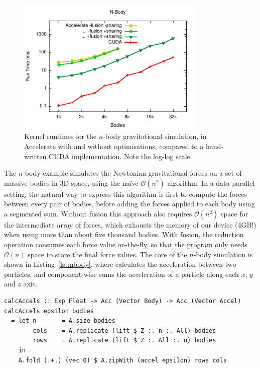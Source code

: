 \begin{figure}
    \begin{center}
        \includegraphics[width=0.8\textwidth]{images/sec-6/nbody/nbody}
    \end{center}
    \caption[N-body gravitational simulation kernel benchmarks]{Kernel runtimes
        for the $n$-body gravitational simulation, in Accelerate with and
        without optimisations, compared to a hand-written CUDA implementation.
        Note the log-log scale.}
    \label{fig:nbody}
\end{figure}

The $n$-body example simulates the Newtonian gravitational forces on a set of
massive bodies in 3D space, using the na\"ive $\mathcal{O}\left( n^{2} \right)$
algorithm. In a data-parallel setting, the natural way to express this algorithm
is first to compute the forces between every pair of bodies, before adding the
forces applied to each body using a segmented sum. Without fusion this approach
also requires $\mathcal{O}\left( n^{2} \right)$ space for the intermediate array
of forces, which exhausts the memory of our device (4GB!) when using more than
about five thousand bodies. With fusion, the reduction operation consumes each
force value on-the-fly, so that the program only needs $\mathcal{O}\left( n
\right)$ space to store the final force values. The core of the $n$-body
simulation is shown in Listing~\ref{lst:nbody}, where  calculates
the acceleration between two particles, and  component-wise sums the
acceleration of a particle along each $x$, $y$ and $z$ axis.

\begin{lstlisting}[style=haskell
    ,float
    ,label=lst:nbody
    ,caption={$N$-body gravitational simulation in Accelerate}]
calcAccels :: Exp Float -> Acc (Vector Body) -> Acc (Vector Accel)
calcAccels epsilon bodies
  = let n       = A.size bodies
        cols    = A.replicate (lift $ Z :. n :. All) bodies
        rows    = A.replicate (lift $ Z :. All :. n) bodies
    in
    A.fold (.+.) (vec 0) $ A.zipWith (accel epsilon) rows cols
\end{lstlisting}


